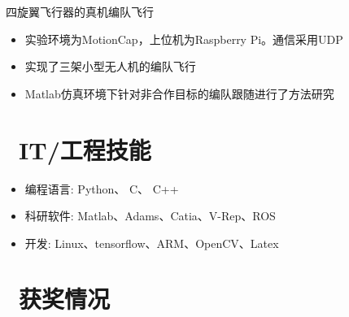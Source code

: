 \documentclass{resume}
\begin{document}
\begin{onehalfspacing}
四旋翼飞行器的真机编队飞行
\begin{itemize}
  \item 实验环境为MotionCap，上位机为Raspberry Pi。通信采用UDP
  \item 实现了三架小型无人机的编队飞行
  \item Matlab仿真环境下针对非合作目标的编队跟随进行了方法研究
\end{itemize}
\end{onehalfspacing}


\section{\faCogs\ IT/工程技能}
\begin{itemize}[parsep=0.5ex]
  \item 编程语言: Python、 C、 C++
  \item 科研软件: Matlab、Adams、Catia、V-Rep、ROS
  \item 开发: Linux、tensorflow、ARM、OpenCV、Latex
\end{itemize}

\section{\faHeartO\ 获奖情况}
\end{document}
